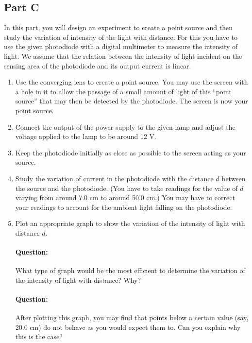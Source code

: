 \subsection*{Part C}

In this part, you will design an experiment to create a point source and then study the variation of intensity of the light with distance.  For this you have to use the given photodiode with a digital multimeter to measure the intensity of light. We assume that the relation between the intensity of light incident on the sensing area of the photodiode and its output current is linear. 

\begin{enumerate}
    \item Use the converging lens to create a point source. You may use the screen with a hole in it to allow the passage of a small amount of light of this ``point source'' that may then be detected by the photodiode. The screen is now your point source. 
    
    \item Connect the output of the power supply to the given lamp and adjust the voltage applied to the lamp to be around 12 V. 
    
    \item Keep the photodiode initially as close as possible to the screen acting as your source. 
    
    \item Study the variation of current in the photodiode with the distance $d$ between the source and the photodiode. (You have to take readings for the value of $d$ varying from around 7.0 cm to around 50.0 cm.) You may have to correct your readings to account for the ambient light falling on the photodiode. 
    \item Plot an appropriate graph to show the variation of the intensity of light with distance $d$.
    
    \begin{question}
    \paragraph{Question:} What type of graph would be the most efficient to determine the variation of the intensity of light with distance? Why? 
    
    \paragraph{Question:} After plotting this graph, you may find that points below a certain value (say, 20.0 cm) do not behave as you would expect them to. Can you explain why this is the case?
    \end{question}
\end{enumerate}



